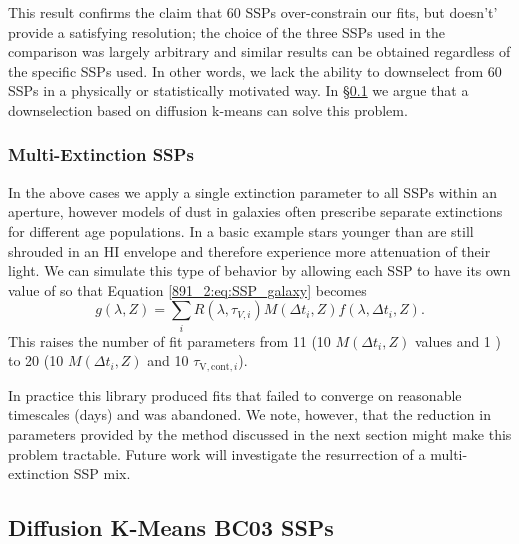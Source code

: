 This result confirms the claim that 60 SSPs over-constrain our fits,
but doesn't' provide a satisfying resolution; the choice of the three
SSPs used in the comparison was largely arbitrary and similar results
can be obtained regardless of the specific SSPs used. In other words,
we lack the ability to downselect from 60 SSPs in a physically or
statistically motivated way. In \S\ref{891_2:sec:bc03_dfk} we argue
that a downselection based on diffusion k-means can solve this
problem.



\subsubsection{Multi-Extinction SSPs}

In the above cases we apply a single extinction parameter to all SSPs
within an aperture, however models of dust in galaxies often prescribe
separate extinctions for different age populations. In a basic example
\citep{Charlot00} stars younger than  are still shrouded
in an HI envelope and therefore experience more attenuation of their
light. We can simulate this type of behavior by allowing each SSP to
have its own value of \tauV so that Equation \ref{891_2:eq:SSP_galaxy}
becomes
\begin{equation}
g(\lambda,Z) = \sum_{i} R(\lambda,\tau_{V,i}) M(\Delta t_i,Z)
f(\lambda,\Delta t_i, Z).
\end{equation}
This raises the number of fit parameters from 11 (10 $M(\Delta t_i, Z)$
values and 1 \tauV) to 20 (10 $M(\Delta t_i, Z)$ and 10
$\tau_{\mathrm{V,cont},i}$).

In practice this library produced fits that failed to converge on
reasonable timescales (days) and was abandoned. We note, however, that
the reduction in parameters provided by the method discussed in the
next section might make this problem tractable. Future work will
investigate the resurrection of a multi-extinction SSP mix.

\subsection{Diffusion K-Means BC03 SSPs}
\label{891_2:sec:bc03_dfk}

